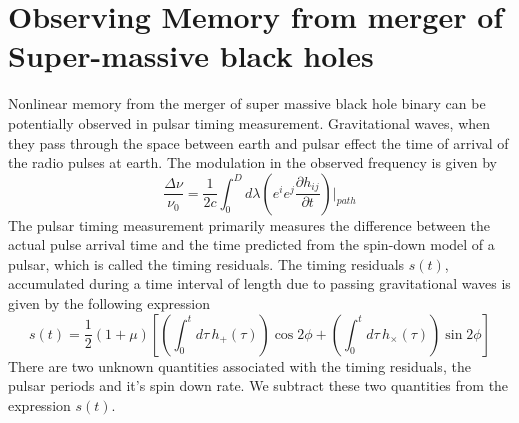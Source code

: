 \documentclass[twocolumn,showpacs,aps,prd,nobibnotes,floatfix]{revtex4-1}
\begin{document}
\section{Observing Memory from merger of Super-massive black holes  }
Nonlinear memory from the merger of super massive black hole binary can be potentially observed in pulsar timing measurement. Gravitational waves, when they pass through the space between earth and pulsar effect the time of arrival of the radio pulses at earth. The modulation in the observed frequency is given by
\begin{equation}
\frac{\Delta \nu}{\nu_{0}} = \frac{1}{2c}\int_{0}^{D}d\lambda \left(e^{i}e^{j}\frac{\partial h_{ij}}{\partial t}\right) \Bigg\vert_{path}
\end{equation}
The pulsar timing measurement primarily measures the difference between the actual pulse arrival time and the time predicted from the spin-down model of a pulsar, which is called the timing residuals. The timing residuals $s(t)$, accumulated during a time interval of length due to passing gravitational waves is given by the following expression 
\begin{equation}
	s(t) = \frac{1}{2}(1+\mu)\left[\left(\int_{0}^{t}d\tau \, h_{+}(\tau)\right)\cos 2\phi + \left(\int_{0}^{t}d\tau \, h_{\times}(\tau)\right)\sin 2\phi\right]
\end{equation}
There are two unknown quantities associated with the timing residuals, the pulsar periods and it's spin down rate. We subtract these two quantities from the expression $s(t)$. 
  
\end{document}

